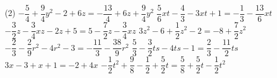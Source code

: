 \documentclass[a4paper,12pt]{report}
\begin{document}
\begin{core}\phantom{ }

\begin{tasks}(2)
\task $-\dfrac{5}{4}  + \dfrac{9}{4} y^2-2  + 6 z={{-\dfrac{13}{4}  + 6 z + \dfrac{9}{4} y^2}}$
\task $\dfrac{5}{6} x t-\dfrac{4}{3} -3 x t + 1={{-\dfrac{1}{3} -\dfrac{13}{6} x t}}$
\task $-\dfrac{3}{2} z-\dfrac{3}{4} x z-2 z + 5 ={{5 -\dfrac{7}{2} z-\dfrac{3}{4} x z}}$
\task $3 z^2-6  + \dfrac{1}{2} z^2-2 ={{-8  + \dfrac{7}{2} z^2}}$
\task $-\dfrac{2}{3} -\dfrac{2}{9} r^2-4 r^2-3 ={{-\dfrac{11}{3} -\dfrac{38}{9} r^2}}$
\task $\dfrac{5}{3} -\dfrac{3}{2} t s-4 t s-1={{\dfrac{2}{3} -\dfrac{11}{2} t s}}$
\task $3 x-3  + x + 1={{-2  + 4 x}}$
\task $-\dfrac{1}{2} t^2 + \dfrac{9}{8} -\dfrac{1}{2}  + \dfrac{5}{2} t={{\dfrac{5}{8}  + \dfrac{5}{2} t-\dfrac{1}{2} t^2}}$
\end{tasks}

\end{core}
\end{document}
